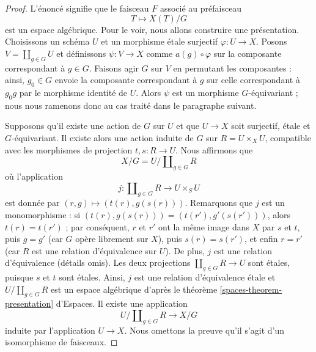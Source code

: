 \begin{proof}
L'énoncé signifie que le faisceau $F$ associé au préfaisceau
$$
T \longmapsto X(T)/G
$$
est un espace algébrique. Pour le voir, nous allons construire une présentation.
Choisissons un schéma $U$ et un morphisme \'etale surjectif
$\varphi : U \to X$. Posons $V = \coprod_{g \in G} U$ et définissons
$\psi : V \to X$ comme $a(g) \circ \varphi$ sur la composante correspondant
à $g \in G$. Faisons agir $G$ sur $V$ en permutant les composantes : ainsi,
$g_0 \in G$ envoie la composante correspondant à $g$ sur celle correspondant
à $g_0g$ par le morphisme identité de $U$.
Alors $\psi$ est un morphisme $G$-équivariant ; nous nous ramenons donc au
cas traité dans le paragraphe suivant.

\medskip\noindent
Supposons qu'il existe une action de $G$ sur $U$ et que $U \to X$ soit surjectif,
\'etale et $G$-équivariant. Il existe alors une
action induite de $G$ sur $R = U \times_X U$, compatible avec les morphismes de
projection $t, s : R \to U$. Nous affirmons que
$$
X/G = U/\coprod\nolimits_{g \in G} R
$$
où l'application
$$
j : \coprod\nolimits_{g \in G} R
\longrightarrow
U \times_S U
$$
est donnée par $(r, g) \mapsto (t(r), g(s(r)))$. Remarquons que $j$ est un monomorphisme :
si $(t(r), g(s(r))) = (t(r'), g'(s(r')))$, alors
$t(r) = t(r')$ ; par conséquent, $r$ et $r'$ ont la même image dans $X$ par
$s$ et $t$, puis $g = g'$ (car $G$ opère librement sur $X$), puis
$s(r) = s(r')$, et enfin $r = r'$ (car $R$ est une relation d'équivalence sur $U$).
De plus, $j$ est une relation d'équivalence (détails omis).
Les deux projections $\coprod\nolimits_{g \in G} R \to U$ sont \'etales, puisque
$s$ et $t$ sont \'etales. Ainsi, $j$ est une relation d'équivalence \'etale
et $U/\coprod\nolimits_{g \in G} R$ est un espace algébrique d'après le
théorème \ref{spaces-theorem-presentation} d'Espaces.
Il existe une application
$$
U/\coprod\nolimits_{g \in G} R \longrightarrow X/G
$$
induite par l'application $U \to X$. Nous omettons la preuve qu'il s'agit d'un
isomorphisme de faisceaux.
\end{proof}












